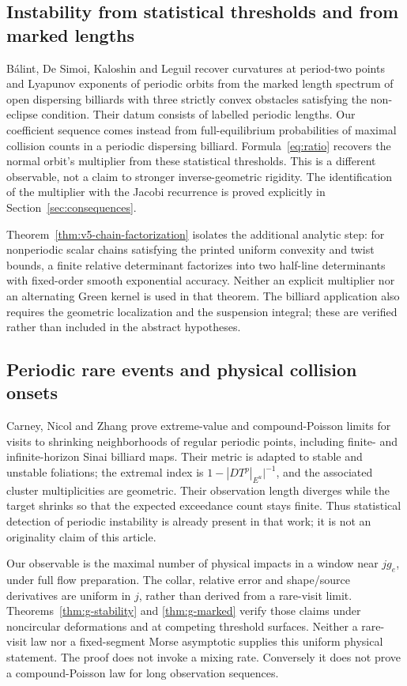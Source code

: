 \subsection{Instability from statistical thresholds and from marked lengths}
B\'alint, De Simoi, Kaloshin and Leguil \cite{BDKL} recover curvatures at
period-two points and Lyapunov exponents of periodic orbits from the marked
length spectrum of open dispersing billiards with three strictly convex
obstacles satisfying the non-eclipse condition. Their datum consists of
labelled periodic lengths. Our coefficient sequence comes instead from
full-equilibrium probabilities of maximal collision counts in a periodic
dispersing billiard. Formula~\eqref{eq:ratio} recovers the normal
orbit's multiplier from these statistical thresholds. This is a different
observable, not a claim to stronger inverse-geometric rigidity. The
identification of the multiplier with the Jacobi recurrence is proved
explicitly in Section~\ref{sec:consequences}.


Theorem~\ref{thm:v5-chain-factorization} isolates the additional
analytic step: for nonperiodic scalar chains satisfying the printed
uniform convexity and twist bounds, a finite relative determinant
factorizes into two half-line determinants with fixed-order smooth
exponential accuracy. Neither an explicit multiplier nor an alternating
Green kernel is used in that theorem. The billiard application also
requires the geometric localization and the suspension integral; these
are verified rather than included in the abstract hypotheses.

\subsection{Periodic rare events and physical collision onsets}
Carney, Nicol and Zhang \cite[Theorems 1--2]{CNZ} prove extreme-value
and compound-Poisson limits for visits to shrinking neighborhoods of
regular periodic points, including finite- and infinite-horizon Sinai
billiard maps. Their metric is adapted to stable and unstable foliations;
the extremal index is $1-|DT^p|_{E^u}|^{-1}$, and the associated
cluster multiplicities are geometric. Their observation length diverges
while the target shrinks so that the expected exceedance count stays
finite. Thus statistical detection of periodic instability is already
present in that work; it is not an originality claim of this article.

Our observable is the maximal number of physical impacts in a window
near $jg_e$, under full flow preparation. The collar, relative error and
shape/source derivatives are uniform in $j$, rather than derived from
a rare-visit limit. Theorems~\ref{thm:g-stability} and
\ref{thm:g-marked} verify those claims under noncircular deformations
and at competing threshold surfaces. Neither a rare-visit law nor a
fixed-segment Morse asymptotic supplies this uniform physical statement.
The proof does not invoke a mixing rate. Conversely it does not prove
a compound-Poisson law for long observation sequences.

